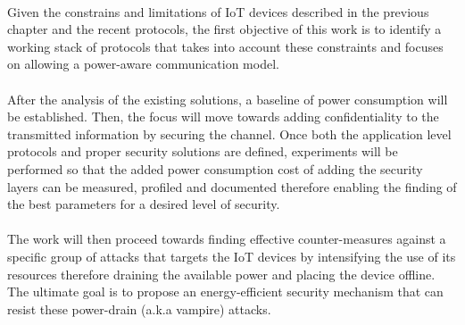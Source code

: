 \paragraph{}
Given the constrains and limitations of \ac{IoT} devices described in the previous chapter and the recent protocols, the first objective of this work is to identify a working stack of protocols that takes into account these constraints and focuses on allowing a power-aware communication model.

\paragraph{}
After the analysis of the existing solutions, a baseline of power consumption will be established. Then, the focus will move towards adding confidentiality to the transmitted information by securing the channel.
Once both the application level protocols and proper security solutions are defined, experiments will be performed so that the added power consumption cost of adding the security layers can be measured, profiled and documented therefore enabling the finding of the best parameters for a desired level of security.

\paragraph{}
The work will then proceed towards finding effective counter-measures against a specific group of attacks that targets the \ac{IoT} devices by intensifying the use of its resources therefore draining the available power and placing the device offline.
The ultimate goal is to propose an energy-efficient security mechanism that can resist these power-drain (a.k.a vampire) attacks.
